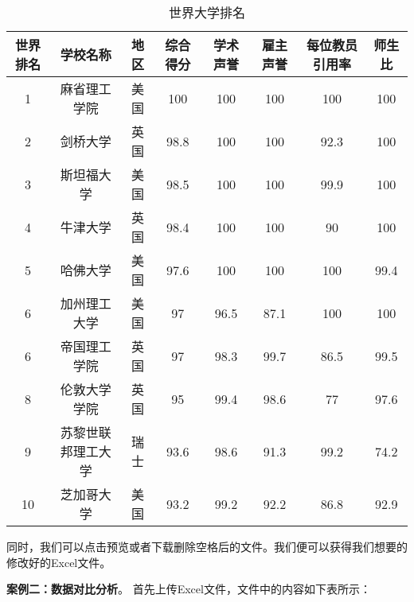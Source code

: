 \begin{table}[h]
    \centering
    \footnotesize
    \begin{tabular}{cccccccc}
        \toprule
        世界排名 & 学校名称 & 地区 & 综合得分 & 学术声誉 & 雇主声誉 & 每位教员引用率 & 师生比 \\
        \midrule
        1  & 麻省理工学院     & 美国 & 100  & 100  & 100  & 100  & 100  \\
        2  & 剑桥大学         & 英国 & 98.8 & 100  & 100  & 92.3 & 100  \\
        3  & 斯坦福大学       & 美国 & 98.5 & 100  & 100  & 99.9 & 100  \\
        4  & 牛津大学         & 英国 & 98.4 & 100  & 100  & 90   & 100  \\
        5  & 哈佛大学         & 美国 & 97.6 & 100  & 100  & 100  & 99.4 \\
        6  & 加州理工大学     & 美国 & 97   & 96.5 & 87.1 & 100  & 100  \\
        6  & 帝国理工学院     & 英国 & 97   & 98.3 & 99.7 & 86.5 & 99.5 \\
        8  & 伦敦大学学院     & 英国 & 95   & 99.4 & 98.6 & 77   & 97.6 \\
        9  & 苏黎世联邦理工大学 & 瑞士 & 93.6 & 98.6 & 91.3 & 99.2 & 74.2 \\
        10 & 芝加哥大学       & 美国 & 93.2 & 99.2 & 92.2 & 86.8 & 92.9 \\
        \bottomrule
    \end{tabular}
    \caption{世界大学排名}
    \label{tab:world_ranking2}
\end{table}
\FloatBarrier
同时，我们可以点击预览或者下载删除空格后的文件。我们便可以获得我们想要的修改好的Excel文件。


\textbf{案例二：数据对比分析}。
首先上传Excel文件，文件中的内容如下表所示：


